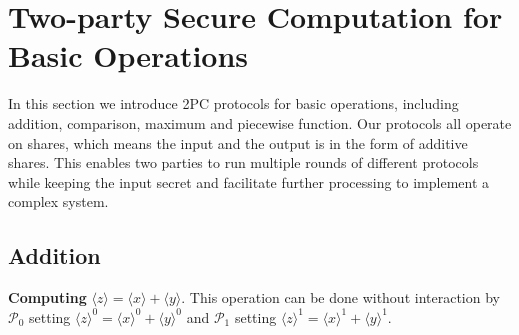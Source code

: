 \documentclass[letterpaper]{article} %
\begin{document}
\section{Two-party Secure Computation for Basic Operations}

    In this section we introduce 2PC protocols for basic operations,
    including addition, comparison, maximum and piecewise function.
    Our protocols all operate on shares, which means
    the input and the output is in the form of additive shares.
    This enables two parties to run multiple rounds of different
    protocols while keeping the input secret
    and facilitate further processing to implement a complex system.


    \subsection{Addition}

    \textbf{Computing} $ \langle z\rangle  = \langle x\rangle  + \langle y\rangle $. This operation can be done without interaction by
    $\mathcal{P}_{0}$ setting $\langle z\rangle^{0}  = \langle x\rangle^{0}  + \langle y\rangle^{0} $ and
    $\mathcal{P}_{1}$ setting $\langle z\rangle^{1}  = \langle x\rangle^{1}  + \langle y\rangle^{1} $.



\end{document}

